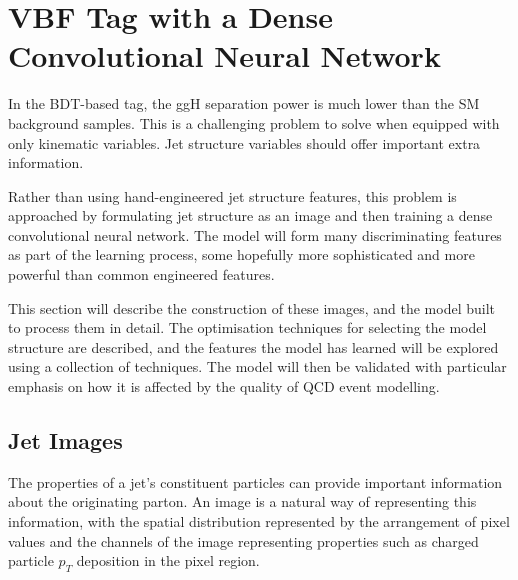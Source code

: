 \section[DCNN VBF Tag]{VBF Tag with a Dense Convolutional Neural Network}
In the BDT-based tag, the ggH separation power is much lower than the SM background samples. 
This is a challenging problem to solve when equipped with only kinematic variables. Jet structure variables should offer important extra information.

Rather than using hand-engineered jet structure features, this problem is approached by formulating jet structure as an image and then training a dense convolutional neural network.
The model will form many discriminating features as part of the learning process, some hopefully more sophisticated  and more powerful than common engineered features. 

This section will describe the construction of these images, and the model built to process them in detail. The optimisation techniques for selecting the model structure are described, and the features the model has learned will be explored using a collection of techniques. The model will then be validated with particular emphasis on how it is affected by the quality of QCD event modelling. 





\subsection{Jet Images}
The properties of a jet's constituent particles can provide important information about the originating parton. 
An image is a natural way of representing this information, with the spatial distribution represented by the arrangement of pixel values and the channels of the image representing properties such as charged particle $p_{T}$ deposition in the pixel region. 

